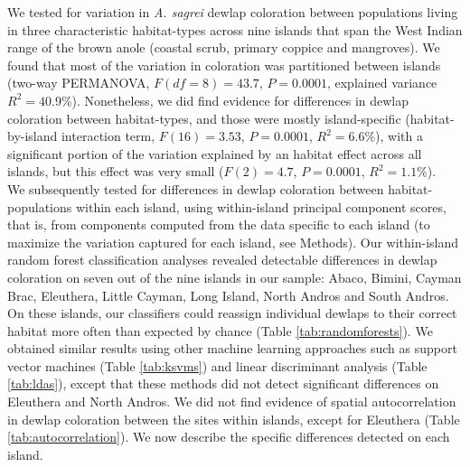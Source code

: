 
We tested for variation in \textit{A. sagrei} dewlap coloration between populations living in three characteristic habitat-types across nine islands that span the West Indian range of the brown anole (coastal scrub, primary coppice and mangroves). We found that most of the variation in coloration was partitioned between islands (two-way PERMANOVA, $F(df = 8) = 43.7$, $P = 0.0001$, explained variance $R^2 = 40.9$\%). Nonetheless, we did find evidence for differences in dewlap coloration between habitat-types, and those were mostly island-specific (habitat-by-island interaction term, $F(16) = 3.53$, $P = 0.0001$, $R^2 = 6.6$\%), with a significant portion of the variation explained by an habitat effect across all islands, but this effect was very small ($F(2) = 4.7$, $P = 0.0001$, $R^2 = 1.1$\%).\\

We subsequently tested for differences in dewlap coloration between habitat-populations within each island, using within-island principal component scores, that is, from components computed from the data specific to each island (to maximize the variation captured for each island, see Methods). Our within-island random forest classification analyses revealed detectable differences in dewlap coloration on seven out of the nine islands in our sample: Abaco, Bimini, Cayman Brac, Eleuthera, Little Cayman, Long Island, North Andros and South Andros. On these islands, our classifiers could reassign individual dewlaps to their correct habitat more often than expected by chance (Table \ref{tab:randomforests}). We obtained similar results using other machine learning approaches such as support vector machines (Table \ref{tab:ksvms}) and linear discriminant analysis (Table \ref{tab:ldas}), except that these methods did not detect significant differences on Eleuthera and North Andros. We did not find evidence of spatial autocorrelation in dewlap coloration between the sites within islands, except for Eleuthera (Table \ref{tab:autocorrelation}). We now describe the specific differences detected on each island.\\

